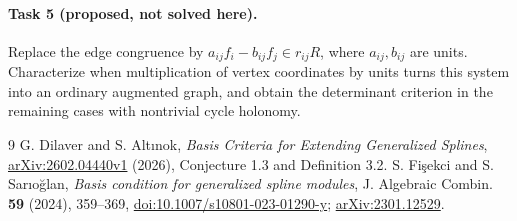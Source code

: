 \documentclass[11pt]{article}
\begin{document}
\paragraph{Task 5 (proposed, not solved here).}
Replace the edge congruence by
$a_{ij}f_i-b_{ij}f_j\in r_{ij}R$, where $a_{ij},b_{ij}$ are units.
Characterize when multiplication of vertex coordinates by units turns
this system into an ordinary augmented graph, and obtain the determinant
criterion in the remaining cases with nontrivial cycle holonomy.

\begin{thebibliography}{9}
 G. Dilaver and S. Alt\i nok,
\emph{Basis Criteria for Extending Generalized Splines},
\href{https://arxiv.org/abs/2602.04440v1}{arXiv:2602.04440v1} (2026),
Conjecture 1.3 and Definition 3.2.
 S. Fi\c sekci and S. Sar\i o\u glan,
\emph{Basis condition for generalized spline modules},
J. Algebraic Combin. \textbf{59} (2024), 359--369,
\href{https://doi.org/10.1007/s10801-023-01290-y}{doi:10.1007/s10801-023-01290-y};
\href{https://arxiv.org/abs/2301.12529}{arXiv:2301.12529}.
\end{thebibliography}
\end{document}
